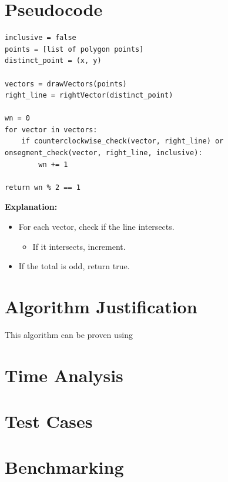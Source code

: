 \documentclass{labReport}
\begin{document}
\begin{multicols*}{2}
\vspace{5em}

\section{Pseudocode}
\begin{verbatim}
inclusive = false
points = [list of polygon points]
distinct_point = (x, y)

vectors = drawVectors(points)
right_line = rightVector(distinct_point)

wn = 0
for vector in vectors:
    if counterclockwise_check(vector, right_line) or onsegment_check(vector, right_line, inclusive):
        wn += 1

return wn % 2 == 1
\end{verbatim}
\textbf{Explanation:}

\begin{itemize}
    \item For each vector, check if the line intersects. 
    \begin{itemize}
        \item If it intersects, increment. 
    \end{itemize}
    \item If the total is odd, return true.
\end{itemize}

\section{Algorithm Justification}
This algorithm can be proven using 

\section{Time Analysis}

\section{Test Cases}


\section{Benchmarking}


\end{multicols*}

\end{document}
